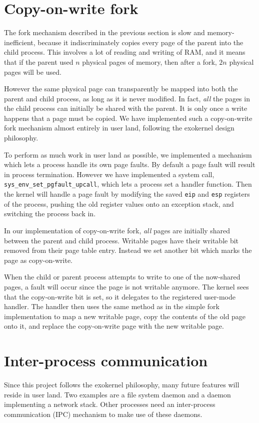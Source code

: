 \documentclass{report}
\begin{document}
\section{Copy-on-write fork}
The fork mechanism described in the previous section is slow and
memory-inefficient, because it indiscriminately copies every page of the
parent into the child process. This involves a lot of reading and writing of
RAM, and it means that if the parent used $n$ physical pages of memory, then
after a fork, $2n$ physical pages will be used.

However the same physical page can transparently be mapped into both the
parent and child process, as long as it is never modified. In fact, \emph{all}
the pages in the child process can initially be shared with the parent. It is
only once a write happens that a page must be copied. We have implemented such
a copy-on-write fork mechanism almost entirely in user land, following the
exokernel design philosophy.

To perform as much work in user land as possible, we implemented a mechanism
which lets a process handle its own page faults. By default a page fault will
result in process termination. However we have implemented a system call,
\texttt{sys\_env\_set\_pgfault\_upcall}, which lets a process set a handler
function. Then the kernel will handle a page fault by modifying the saved
\texttt{eip} and \texttt{esp} registers of the process, pushing the old register
values onto an exception stack, and switching the process back in.

In our implementation of copy-on-write fork, \emph{all} pages are initially
shared between the parent and child process. Writable pages have their
writable bit removed from their page table entry. Instead we set another
bit which marks the page as copy-on-write.

When the child or parent process attempts to write to one of the now-shared
pages, a fault will occur since the page is not writable anymore. The kernel
sees that the copy-on-write bit is set, so it delegates to the
registered user-mode handler. The handler then uses the same method as in the
simple fork implementation to map a new writable page, copy the contents of
the old page onto it, and replace the copy-on-write page with the new writable
page.


\section{Inter-process communication}
Since this project follows the exokernel philosophy, many future features will
reside in user land. Two examples are a file system daemon and a daemon
implementing a network stack. Other processes need an inter-process
communication (IPC) mechanism to make use of these daemons.
\end{document}
